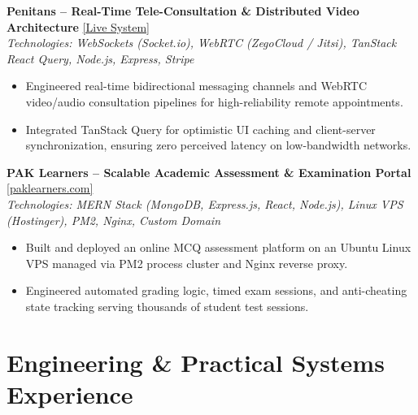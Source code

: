 \documentclass[10pt,a4paper]{article}
\begin{document}
\vspace{3pt}
\textbf{Penitans -- Real-Time Tele-Consultation \& Distributed Video Architecture} \hfill \href{https://penitans.com}{[Live System]} \\
\textit{Technologies: WebSockets (Socket.io), WebRTC (ZegoCloud / Jitsi), TanStack React Query, Node.js, Express, Stripe}
\begin{itemize}
    \item Engineered real-time bidirectional messaging channels and WebRTC video/audio consultation pipelines for high-reliability remote appointments.
    \item Integrated TanStack Query for optimistic UI caching and client-server synchronization, ensuring zero perceived latency on low-bandwidth networks.
\end{itemize}

\vspace{3pt}
\textbf{PAK Learners -- Scalable Academic Assessment \& Examination Portal} \hfill \href{https://paklearners.com}{[paklearners.com]} \\
\textit{Technologies: MERN Stack (MongoDB, Express.js, React, Node.js), Linux VPS (Hostinger), PM2, Nginx, Custom Domain}
\begin{itemize}
    \item Built and deployed an online MCQ assessment platform on an Ubuntu Linux VPS managed via PM2 process cluster and Nginx reverse proxy.
    \item Engineered automated grading logic, timed exam sessions, and anti-cheating state tracking serving thousands of student test sessions.
\end{itemize}

\newpage

\section{Engineering \& Practical Systems Experience}
\end{document}
